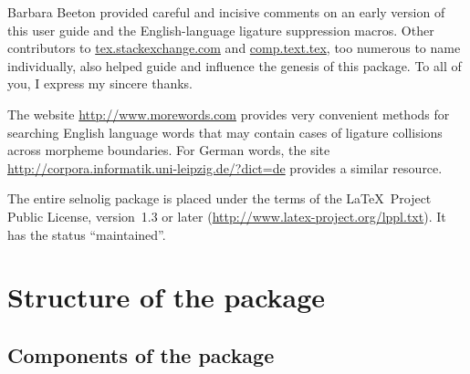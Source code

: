 \documentclass[12pt]{article}
\newcommand{\pkg}[1]{\textsf{#1}}
\begin{document}
Barbara Beeton provided careful and incisive comments on an early version of this user guide and the English-language ligature suppression macros. Other contributors to \url{tex.stackexchange.com} and \url{comp.text.tex}, too numerous to name individually, also helped guide and influence the genesis of this package. To all of you, I express my sincere thanks.

The website \url{http://www.morewords.com} provides very convenient methods for searching English language words that may contain cases of ligature collisions across morpheme boundaries. For German words, the site  \url{http://corpora.informatik.uni-leipzig.de/?dict=de} provides a similar resource. 

The entire \pkg{selnolig} package is placed under the terms of the \LaTeX\ Project Public License, version~1.3 or later (\url{http://www.latex-project.org/lppl.txt}).
It has the status \enquote{maintained}.


\section{Structure of the package}

\subsection{Components of the package}
\end{document}
